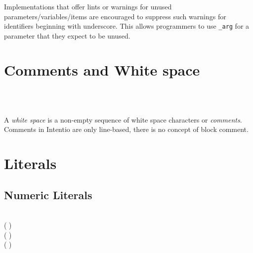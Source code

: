 Implementations that offer lints or warnings for unused parameters/variables/items are encouraged to suppress such warnings for identifiers beginning with underscore. This allows programmers to use \texttt{\_arg} for a parameter that they expect to be unused.

\section{Comments and White space}

\begin{bnf}
   \eq {} \\
      \eq \term{\#} \  \ 
\end{bnf}

A \emph{white space} is a non-empty sequence of white space characters or \emph{comments}. Comments in Intentio are only line-based, there is no concept of block comment.

\section{Literals}

\begin{bnf}
   \eq {} \gor {} \gor {}
\end{bnf}

\subsection{Numeric Literals}

\begin{bnf}
       \eq {} \  \\
        \eq ( \gor {}) \  \  \\
         \eq ( \gor {}) \  \  \\
   \eq ( \gor {}) \  \  \\
  \\
   \eq {} \gor {} \gor {} \gor {} \\
\end{bnf}

